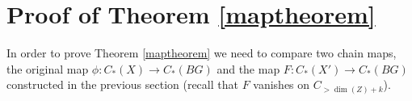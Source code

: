 \documentclass[11pt,letterpaper]{amsart}
\newtheorem*{remark}{Remark}
\begin{document}

\section{Proof of Theorem \ref{maptheorem}\label{proofoftheorem}}
In order to prove Theorem \ref{maptheorem} we need to compare two chain maps, the original map $\phi:C_*(X)\rightarrow C_*(BG)$ and the map $F:C_*(X')\rightarrow C_*(BG)$ constructed in the previous section (recall that $F$ vanishes on $C_{>\dim(Z)+k}$). 
\end{document}

